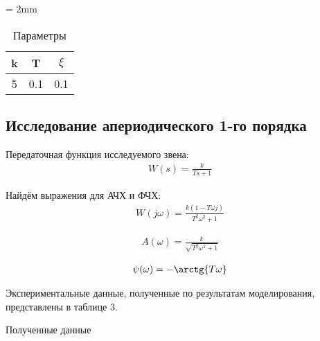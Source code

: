 \documentclass[a4paper, 12pt]{article}
\begin{document}
\begin{table}[h!]
    \tabulinesep = 2mm
    \centering
    \begin{threeparttable}
    	\caption{Параметры}\label{tab:perflogcross}
    	\begin{tabular}{|c|c|c|}
    		\hline
        	k & T & $\xi$ \\ \hline
        	5 & 0.1 & 0.1 \\
        	\hline
    	\end{tabular}
    \end{threeparttable} 
\end{table}

\newpage
\begin{center}
	\section{Исследование апериодического 1-го порядка}
\end{center}

\par 
Передаточная функция исследуемого звена:
\begin{align}
	W(s)=\frac{k}{Ts+1}
\end{align}
\par 
Найдём выражения для АЧХ и ФЧХ:
\begin{align}
W(j\omega) = \frac{k(1-T\omega j)}{T^2\omega^2 + 1}
\end{align}

\begin{align}
	A(\omega) = \frac{k}{\sqrt{T^2\omega^2 + 1}}
\end{align}
	
\begin{align}
	\psi(\omega) =-\arctg{T\omega}
\end{align}

\par 
Экспериментальные данные, полученные по результатам моделирования, представлены в таблице 3.
\begin{table}[h!]
    \centering
    \begin{threeparttable}
        \caption{Полученные данные} \label{tab:perflogcross}
    \end{threeparttable}
\end{table}
\end{document}
